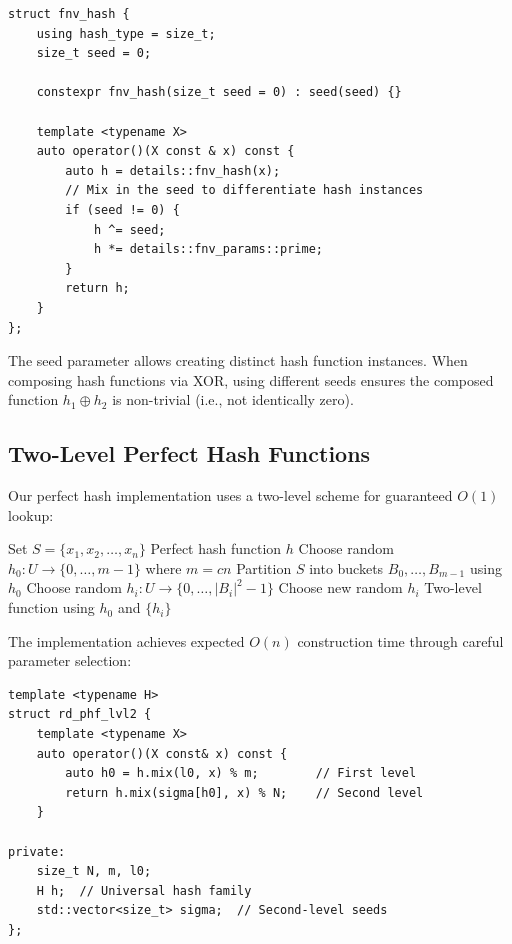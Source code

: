 \documentclass[11pt,a4paper]{article}
\theoremstyle{definition}
\begin{document}
\begin{lstlisting}[caption={FNV-1a hash function with seed support}]
struct fnv_hash {
    using hash_type = size_t;
    size_t seed = 0;

    constexpr fnv_hash(size_t seed = 0) : seed(seed) {}

    template <typename X>
    auto operator()(X const & x) const {
        auto h = details::fnv_hash(x);
        // Mix in the seed to differentiate hash instances
        if (seed != 0) {
            h ^= seed;
            h *= details::fnv_params::prime;
        }
        return h;
    }
};
\end{lstlisting}

The seed parameter allows creating distinct hash function instances. When composing hash functions via XOR, using different seeds ensures the composed function $h_1 \oplus h_2$ is non-trivial (i.e., not identically zero).

\subsection{Two-Level Perfect Hash Functions}

Our perfect hash implementation uses a two-level scheme for guaranteed $O(1)$ lookup:

\begin{algorithm}
\caption{Two-Level Perfect Hash Construction}
\begin{algorithmic}[1]
\REQUIRE Set $S = \{x_1, x_2, \ldots, x_n\}$
\ENSURE Perfect hash function $h$
\STATE Choose random $h_0: U \rightarrow \{0, \ldots, m-1\}$ where $m = cn$
\STATE Partition $S$ into buckets $B_0, \ldots, B_{m-1}$ using $h_0$
    \STATE Choose random $h_i: U \rightarrow \{0, \ldots, |B_i|^2-1\}$
        \STATE Choose new random $h_i$
    \ENDWHILE
\ENDFOR
\RETURN Two-level function using $h_0$ and $\{h_i\}$
\end{algorithmic}
\end{algorithm}

The implementation achieves expected $O(n)$ construction time through careful parameter selection:

\begin{lstlisting}[caption={Two-level PHF query implementation}]
template <typename H>
struct rd_phf_lvl2 {
    template <typename X>
    auto operator()(X const& x) const {
        auto h0 = h.mix(l0, x) % m;        // First level
        return h.mix(sigma[h0], x) % N;    // Second level
    }

private:
    size_t N, m, l0;
    H h;  // Universal hash family
    std::vector<size_t> sigma;  // Second-level seeds
};
\end{lstlisting}
\end{document}
